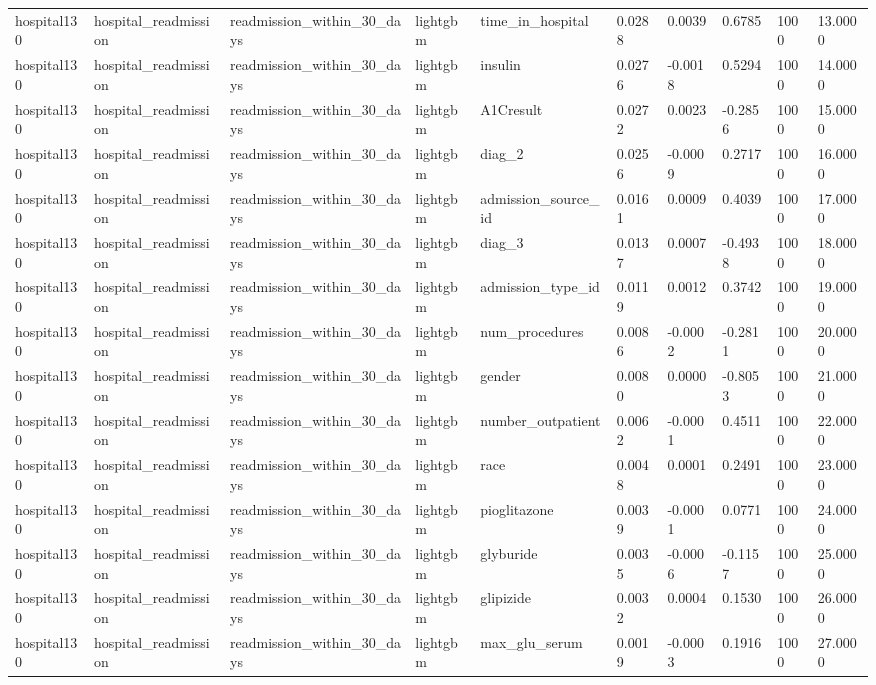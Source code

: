 \begin{tabular}{llllllllll}
hospital130 & hospital\_readmission & readmission\_within\_30\_days & lightgbm & time\_in\_hospital & 0.0288 & 0.0039 & 0.6785 & 1000 & 13.0000 \\
hospital130 & hospital\_readmission & readmission\_within\_30\_days & lightgbm & insulin & 0.0276 & -0.0018 & 0.5294 & 1000 & 14.0000 \\
hospital130 & hospital\_readmission & readmission\_within\_30\_days & lightgbm & A1Cresult & 0.0272 & 0.0023 & -0.2856 & 1000 & 15.0000 \\
hospital130 & hospital\_readmission & readmission\_within\_30\_days & lightgbm & diag\_2 & 0.0256 & -0.0009 & 0.2717 & 1000 & 16.0000 \\
hospital130 & hospital\_readmission & readmission\_within\_30\_days & lightgbm & admission\_source\_id & 0.0161 & 0.0009 & 0.4039 & 1000 & 17.0000 \\
hospital130 & hospital\_readmission & readmission\_within\_30\_days & lightgbm & diag\_3 & 0.0137 & 0.0007 & -0.4938 & 1000 & 18.0000 \\
hospital130 & hospital\_readmission & readmission\_within\_30\_days & lightgbm & admission\_type\_id & 0.0119 & 0.0012 & 0.3742 & 1000 & 19.0000 \\
hospital130 & hospital\_readmission & readmission\_within\_30\_days & lightgbm & num\_procedures & 0.0086 & -0.0002 & -0.2811 & 1000 & 20.0000 \\
hospital130 & hospital\_readmission & readmission\_within\_30\_days & lightgbm & gender & 0.0080 & 0.0000 & -0.8053 & 1000 & 21.0000 \\
hospital130 & hospital\_readmission & readmission\_within\_30\_days & lightgbm & number\_outpatient & 0.0062 & -0.0001 & 0.4511 & 1000 & 22.0000 \\
hospital130 & hospital\_readmission & readmission\_within\_30\_days & lightgbm & race & 0.0048 & 0.0001 & 0.2491 & 1000 & 23.0000 \\
hospital130 & hospital\_readmission & readmission\_within\_30\_days & lightgbm & pioglitazone & 0.0039 & -0.0001 & 0.0771 & 1000 & 24.0000 \\
hospital130 & hospital\_readmission & readmission\_within\_30\_days & lightgbm & glyburide & 0.0035 & -0.0006 & -0.1157 & 1000 & 25.0000 \\
hospital130 & hospital\_readmission & readmission\_within\_30\_days & lightgbm & glipizide & 0.0032 & 0.0004 & 0.1530 & 1000 & 26.0000 \\
hospital130 & hospital\_readmission & readmission\_within\_30\_days & lightgbm & max\_glu\_serum & 0.0019 & -0.0003 & 0.1916 & 1000 & 27.0000 \\

\end{tabular}
